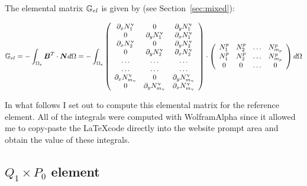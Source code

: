 The elemental matrix ${\mathbb{G}}_{el}$ is given by (see Section~\ref{sec:mixed}):

\[
{\mathbb{G}}_{el} = -\int_{\Omega_e} {\bm B}^T \cdot {\bm N} d\Omega
= -\int_{\Omega_e}
\left(
\begin{array}{ccc}
\partial_x N_1^\upnu & 0 & \partial_y N_1^\upnu \\
0 & \partial_y N_1^\upnu & \partial_x N_1^\upnu \\
\partial_x N_2^\upnu & 0 & \partial_y N_2^\upnu \\
0 & \partial_y N_2^\upnu & \partial_x N_2^\upnu \\
\dots & \dots & \dots \\
\dots & \dots & \dots \\
\partial_x N_{m_\upnu}^\upnu & 0 & \partial_y N_{m_\upnu}^\upnu \\
0 & \partial_y N_{m_\upnu}^\upnu & \partial_x N_{m_\upnu}^\upnu 
\end{array}
\right)
\cdot
\left(
\begin{array}{cccc}
N_1^p & N_2^p & \dots & N_{m_p}^p \\ 
N_1^p & N_2^p & \dots & N_{m_p}^p \\ 
0 & 0 & \dots & 0
\end{array}
\right)
d\Omega
\]

In what follows I set out to compute this elemental matrix for the reference element.
All of the integrals were computed with WolframAlpha since it allowed me to copy-paste 
the \LaTeX code directly into the website prompt area and obtain the value of these integrals.


\subsection{$Q_1\times P_0$ element}

